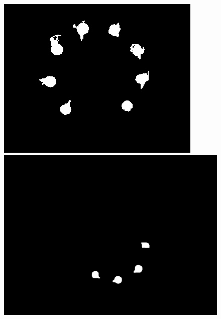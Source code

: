 \documentclass[a4paper]{ctexart}
\begin{document}
\begin{enumerate}[label=\arabic*、]
\begin{figure}[htbp]
\begin{minipage}[t]{0.25\textwidth}
			\includegraphics[width=\textwidth]{figure/drop_center/img1.jpg}
		\end{minipage}
		\begin{minipage}[t]{0.25\textwidth}
			\centering
			\includegraphics[width=\textwidth]{figure/drop_center/img2.jpg}
		\end{minipage}\\
		\begin{minipage}[t]{0.25\textwidth}
			\centering

\end{minipage}
\end{figure}
\end{enumerate}
\end{document}
